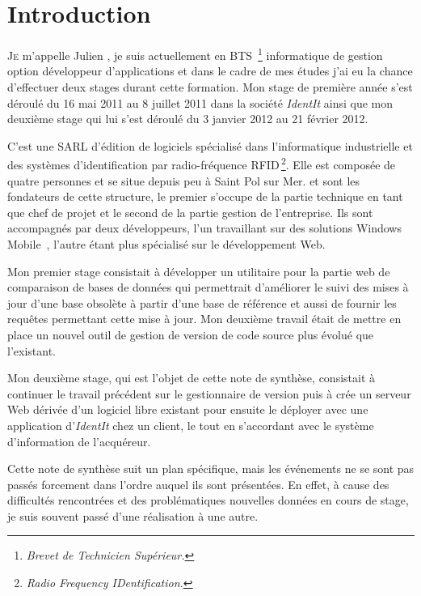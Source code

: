 \chapter{Introduction} %
\label{cha:Introduction}

\lettrine{J}{e} m'appelle Julien , je suis actuellement en
BTS\, \footnote{\emph{Brevet de Technicien Supérieur.}} informatique de
gestion option développeur d'applications et dans le cadre de mes études
j'ai eu la chance d'effectuer deux stages durant cette formation. Mon
stage de première année s'est déroulé du 16 mai 2011 au 8 juillet 2011
dans la société \emph{IdentIt} ainsi que mon deuxième stage qui lui
s'est déroulé du 3 janvier 2012 au 21 février 2012.

C'est une SARL d'édition de logiciels spécialisé dans l'informatique
industrielle et des systèmes d'identification par radio-fréquence
RFID\,\footnote{\emph{Radio Frequency IDentification.}}. Elle est
composée de quatre personnes et se situe depuis peu à Saint Pol sur Mer.
 et  sont les fondateurs de cette
structure, le premier s'occupe de la partie technique en tant que chef
de projet et le second de la partie gestion de l'entreprise. Ils sont
accompagnés par deux développeurs, l'un travaillant sur des solutions
Windows Mobile~\textregistered, l'autre étant plus spécialisé sur le
développement Web.

Mon premier stage consistait à développer un utilitaire pour la partie
web de comparaison de bases de données qui permettrait d'améliorer le
suivi des mises à jour d'une base obsolète à partir d'une base de
référence et aussi de fournir les requêtes permettant cette mise à jour.
Mon deuxième travail était de mettre en place un nouvel outil de gestion
de version de code source plus évolué que l'existant.

Mon deuxième stage, qui est l'objet de cette note de synthèse,
consistait à continuer le travail précédent sur le gestionnaire de
version puis à crée un serveur Web dérivée d'un logiciel libre existant
pour ensuite le déployer avec une application d'\emph{IdentIt} chez un
client, le tout en s'accordant avec le système d'information de
l'acquéreur.

Cette note de synthèse suit un plan spécifique, mais les événements ne
se sont pas passés forcement dans l'ordre auquel ils sont présentées. En
effet, à cause des difficultés rencontrées et des problématiques
nouvelles données en cours de stage, je suis souvent passé d'une
réalisation à une autre.
